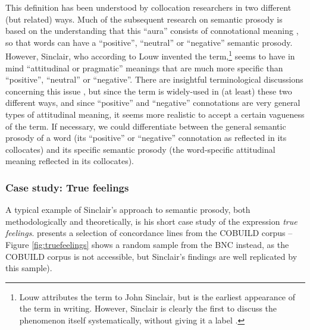 This definition has been understood by collocation researchers in two different (but related) ways. Much of the subsequent research on semantic prosody is based on the understanding that this ``aura'' consists of connotational meaning \citep[cf. e.g.][68]{partington_patterns_1998}, so that words can have a ``positive'', ``neutral'' or ``negative'' semantic prosody. However, Sinclair, who according to Louw invented the term,\footnote{Louw attributes the term to John Sinclair, but \citet{louw_irony_1993} is the earliest appearance of the term in writing. However, Sinclair is clearly the first to discuss the phenomenon itself systematically, without giving it a label \citep[e.g.][74--75]{sinclair_corpus_1991}.} seems to have in mind ``attitudinal or pragmatic'' meanings that are much more specific than ``positive'', ``neutral'' or ``negative''. There are insightful terminological discussions concerning this issue \citep[cf. e.g.][]{hunston_semantic_2007}, but since the term is widely-used in (at least) these two different ways, and since ``positive'' and ``negative'' connotations are very general types of attitudinal meaning, it seems more realistic to accept a certain vagueness of the term. If necessary, we could differentiate between the general semantic prosody of a word (its ``positive'' or ``negative'' connotation as reflected in its collocates) and its specific semantic prosody (the word-specific attitudinal meaning reflected in its collocates).

\subsubsection{Case study: True feelings}
\label{sec:truefeelings}

A typical example of Sinclair's approach to semantic prosody, both methodologically and theoretically, is his short case study of the expression \textit{true feelings}. \citet{sinclair_search_1996} presents a selection of concordance lines from the COBUILD corpus -- Figure \ref{fig:truefeelings} shows a random sample from the BNC instead, as the COBUILD corpus is not accessible, but Sinclair's findings are well replicated by this sample).

